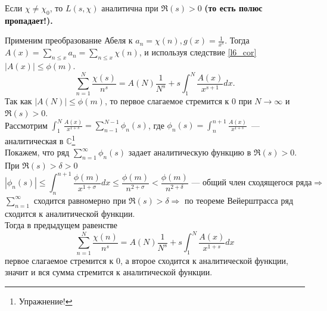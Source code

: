 \begin{lemma} \label{l7_lm6}
	Если $\chi \ne \chi_0$, то $L(s, \chi)$ аналитична при $\Re(s) > 0$ \bf (то есть полюс пропадает!).
\end{lemma}
\begin{pf}
	Применим преобразование Абеля к $\displaystyle a_n = \chi(n), g(x) = \frac{1}{x^s}$. Тогда $\displaystyle A(x) = \sum_{n \leq x} a_n = \sum_{n \leq x} \chi(n)$, и используя следствие \ref{l6_cor} $|A(x)| \leq \phi(m)$.
	$$\sum_{n = 1}^{N} \frac{\chi(s)}{n^s} = A(N) \frac{1}{N^s} + s \int_{1}^{N} \frac{A(x)}{x^{s + 1}} dx.$$
	Так как $|A(N)| \leq \phi(m)$, то первое слагаемое стремится к $0$ при $N \rightarrow \infty$ и $\Re(s) > 0$.\\
	Рассмотрим $\displaystyle \int_1^N \frac{A(x)}{x^{1 + s}} = \sum_{n - 1}^{N - 1} \phi_n(s)$, где $\displaystyle \phi_n(s) = \int_{n}^{n + 1} \frac{A(x)}{x^{1 + s}}$ — аналитическая в $\mathbb{C}$\footnote{Упражнение!}\\
	Покажем, что ряд $\displaystyle \sum_{n = 1}^{\infty} \phi_n(s)$ задает аналитическую функцию в $\Re(s) > 0$. При $\Re(s) > \delta > 0$
	$$|\phi_n(s)| \leq \int_n^{n + 1} \frac{\phi(m)}{x^{1 + \sigma}} dx \leq  \frac{\phi(m)}{n^{2 + \sigma}} < \frac{\phi(m)}{n^{2 + \delta}} \text{ —  общий член сходящегося ряда} \Rightarrow$$
	$\displaystyle \sum_{n = 1}^{\infty}$ сходится равномерно при $\Re(s) > \delta \Rightarrow$ по теореме Вейерштрасса ряд сходится к аналитической функции.\\
	Тогда в предыдущем равенстве
	$$\sum_{n = 1}^{N} \frac{\chi(n)}{n^s} = A(N) \frac{1}{N^s} + s \int_{1}^{N} \frac{A(x)}{x^{1 + s}} dx$$
	первое слагаемое стремится к 0, а второе сходится к аналитической функции, значит и вся сумма стремится к аналитической функции.
\end{pf}

